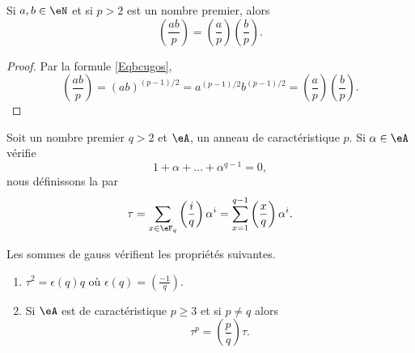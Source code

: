 \begin{corollary}   \label{CoruJosNz}
    Si \( a,b\in \eN\) et si \( p>2\) est un nombre premier, alors
    \begin{equation}
        \left(\frac{ab}{p}\right)=\left(\frac{a}{p}\right)\left(\frac{b}{p}\right).
    \end{equation}
\end{corollary}

\begin{proof}
    Par la formule \eqref{Eqbcugos},
    \begin{equation}
        \left(\frac{ab}{p}\right)=(ab)^{(p-1)/2}=a^{(p-1)/2}b^{(p-1)/2}=\left(\frac{a}{p}\right)\left(\frac{b}{p}\right).
    \end{equation}
\end{proof}

Soit un nombre premier \( q>2\) et \( \eA\), un anneau de caractéristique \( p\). Si \( \alpha\in \eA\) vérifie
\begin{equation}
    1+\alpha+\ldots+\alpha^{q-1}=0,
\end{equation}
nous définissons la  par
\begin{equation}
    \tau=\sum_{x\in \eF_q}\left(\frac{i}{q}\right)\alpha^i=\sum_{x=1}^{q-1}\left(\frac{x}{q}\right)\alpha^i.
\end{equation}

\begin{proposition}
    Les sommes de gauss vérifient les propriétés suivantes.
    \begin{enumerate}
        \item
                $\tau^2=\epsilon(q)q$
            où \( \epsilon(q)=\left(\frac{-1}{q}\right)\).

        \item
            Si \( \eA\) est de caractéristique \( p\geq 3\) et si \( p\neq q\) alors
            \begin{equation}
                \tau^p=\left(\frac{p}{q}\right)\tau.
            \end{equation}
    \end{enumerate}
\end{proposition}


